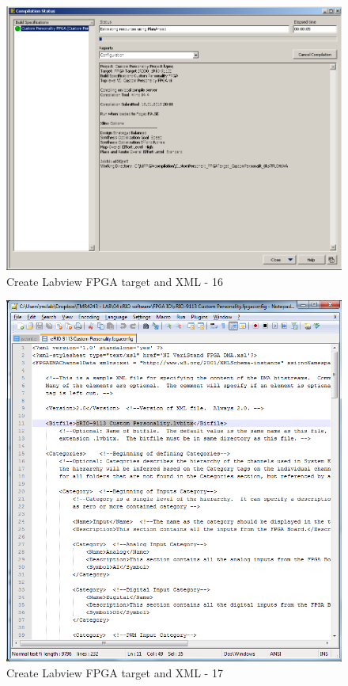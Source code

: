 \documentclass[a4paper,twoside,english]{report}
\begin{document}
\begin{figure}[!h]
\centering \includegraphics[scale=0.45]{Screenshots/Screenshot_2015-01-16_20-01-32.png}
\caption{Create Labview FPGA target and XML - 16}

\label{fig: Create Labview FPGA target and XML-16} 
\end{figure}

\begin{figure}[!h]
\centering \includegraphics[scale=0.45]{Screenshots/Screenshot_2015-01-17_13-59-31.png}
\caption{Create Labview FPGA target and XML - 17}

\label{fig: Create Labview FPGA target and XML-17} 
\end{figure}
\end{document}
